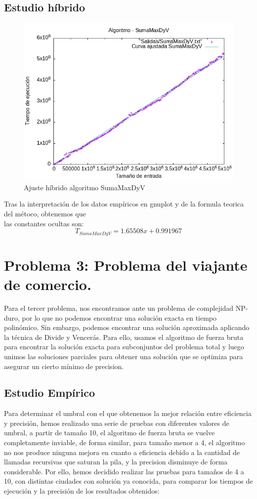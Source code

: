 \documentclass[11pt,openany]{book}
\begin{document}
\subsection{Estudio híbrido}
\begin{center}
      \begin{figure}[h]
            \centering
            \includegraphics[width=0.7\linewidth]{assets/Img/SumaMaxDyV_hib.png}
            \caption{Ajuste híbrido algoritmo SumaMaxDyV}
            \label{fig:sumaMax}
      \end{figure}
\end{center}
Tras la interpretación de los datos empíricos en gnuplot y de la formula teorica del métoco, obtenemos que \\
las constantes ocultas son:
\begin{equation*}
      T_{SumaMaxDyV}=1.65508x + 0.991967
\end{equation*}

\section{Problema 3: Problema del viajante de comercio.}
Para el tercer problema, nos encontramos ante un problema de complejidad
NP-duro, por lo que no podemos encontrar una solución exacta en tiempo polinómico.
Sin embargo, podemos encontrar una solución aproximada aplicando la técnica de Divide y Vencerás.
Para ello, usamos el algoritmo de fuerza bruta para encontrar la solución exacta para subconjuntos
del problema total y luego unimos las soluciones parciales para obtener una solución que se optimiza
para asegurar un cierto mínimo de precision.

\subsection{Estudio Empírico}
Para determinar el umbral con el que obtenemos la mejor relación entre eficiencia y precisión, hemos
realizado una serie de pruebas con diferentes valores de umbral, a partir de tamaño 10, el algoritmo de
fuerza bruta se vuelve completamente inviable, de forma similar, para tamaño menor a 4, el algoritmo
no nos produce ninguna mejora en cuanto a eficiencia debido a la cantidad de llamadas recursivas que
saturan la pila, y la precision disminuye de forma considerable. Por ello, hemos decidido realizar
las pruebas para tamaños de 4 a 10, con distintas ciudades con solución ya conocida, para comparar
los tiempos de ejecución y la precisión de los resultados obtenidos:
\end{document}
